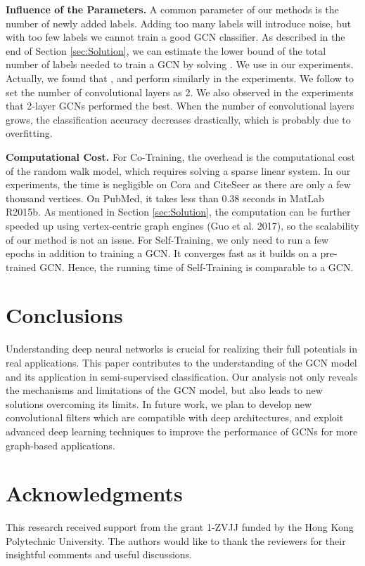 \documentclass[letterpaper]{article} \usepackage{aaai18}  \usepackage{times}  \usepackage{helvet}  \usepackage{courier}  \usepackage{url}  \usepackage{graphicx}  \usepackage{algorithm}
\begin{document}
\textbf{Influence of the Parameters.} A common parameter of our methods is the number of newly added labels. Adding too many labels will introduce noise, but with too few labels we cannot train a good GCN classifier. As described in the end of Section \ref{sec:Solution}, we can estimate the lower bound of the total number of labels  needed to train a GCN by solving . We use  in our experiments. Actually, we found that ,  and  perform similarly in the experiments. We follow \citeauthor{kipf2016semi} to set the number of convolutional layers as 2. We also observed in the experiments that 2-layer GCNs performed the best. When the number of convolutional layers grows, the classification accuracy decreases drastically, which is probably due to overfitting.

\textbf{Computational Cost.} For Co-Training, the overhead is the computational cost of the random walk model, which requires solving a sparse linear system. In our experiments, the time is negligible on Cora and CiteSeer as there are only a few thousand vertices. On PubMed, it takes less than 0.38 seconds in MatLab R2015b. As mentioned in Section \ref{sec:Solution}, the computation can be further speeded up using vertex-centric graph engines (Guo et al. 2017), so the scalability of our method is not an issue. For Self-Training, we only need to run a few epochs in addition to training a GCN. It converges fast as it builds on a pre-trained GCN. Hence, the running time of Self-Training is comparable to a GCN.



















\section{Conclusions}\label{sec:conclusion}

Understanding deep neural networks is crucial for realizing their full potentials in real applications. This paper contributes to the understanding of the GCN model and its application in semi-supervised classification. Our analysis not only reveals the mechanisms and limitations of the GCN model, but also leads to new solutions overcoming its limits. In future work, we plan to develop new convolutional filters which are compatible with deep architectures, and exploit advanced deep learning techniques to improve the performance of GCNs for more graph-based applications.

\section*{Acknowledgments}

This research received support from the grant 1-ZVJJ funded by the Hong Kong Polytechnic University. The authors would like to thank the reviewers for their insightful comments and useful discussions.













\end{document}
